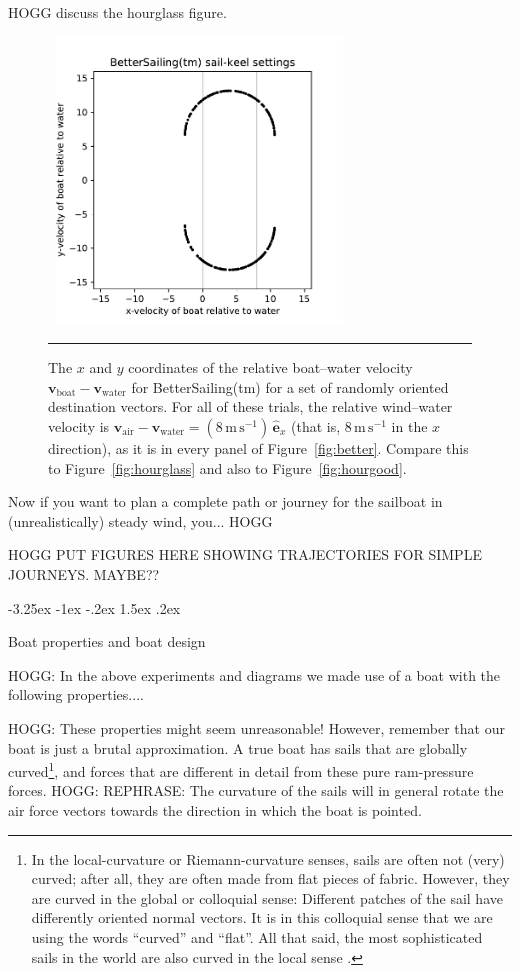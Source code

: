 \documentclass[letterpaper]{article}
\makeatletter
\renewcommand{\vec}[1]{\boldsymbol{#1}}
\newcommand{\uvec}{\vec{\hat{e}}}
\newcommand{\air}{\text{air}}
\newcommand{\water}{\text{water}}
\newcommand{\boat}{\text{boat}}
\newcommand{\vair}{\vec{v}_\air}
\newcommand{\vwater}{\vec{v}_\water}
\newcommand{\vboat}{\vec{v}_\boat}
\newcommand{\mps}{\mathrm{m\,s^{-1}}}
\newcommand{\figref}[1]{Figure~\ref{#1}}
\renewcommand\section{\@startsection {section}{1}{\z@}%
  {-3.25ex \@plus -1ex \@minus -.2ex}%
  {1.5ex \@plus .2ex}%
  {\raggedright\normalfont\large\bfseries}}
\newcommand{\figurerule}{\rule[1ex]{\textwidth}{0.2pt}}
\makeatother
\begin{document}
HOGG discuss the hourglass figure.
\begin{figure}[t!]
  ~\hfill\includegraphics[width=3in]{hourglass-better.pdf}\hfill~
  \caption{The $x$ and $y$ coordinates of the relative boat--water velocity $\vboat-\vwater$ for BetterSailing(tm) for a set of randomly oriented destination vectors.
  For all of these trials, the relative wind--water velocity is $\vair-\vwater=(8\,\mps)\,\uvec_x$ (that is, $8\,\mps$ in the $x$ direction), as it is in every panel of \figref{fig:better}.
  Compare this to \figref{fig:hourglass} and also to \figref{fig:hourgood}.\label{fig:hourbetter}}
  \figurerule
\end{figure}

Now if you want to plan a complete path or journey for the sailboat in (unrealistically) steady wind, you... HOGG

HOGG PUT FIGURES HERE SHOWING TRAJECTORIES FOR SIMPLE JOURNEYS. MAYBE??

\section{Boat properties and boat design}\label{sec:design}

HOGG: In the above experiments and diagrams we made use of a boat with the following properties....

HOGG: These properties might seem unreasonable! However, remember that our boat is just a brutal approximation.
A true boat has sails that are globally curved\footnote{%
In the local-curvature or Riemann-curvature senses, sails are often not (very) curved; after all, they are often made from flat pieces of fabric.
However, they are curved in the global or colloquial sense: Different patches of the sail have differently oriented normal vectors.
It is in this colloquial sense that we are using the words ``curved'' and ``flat''.
All that said, the most sophisticated sails in the world are also curved in the local sense \cite{sails}.},
and forces that are different in detail from these pure ram-pressure forces.
HOGG: REPHRASE: The curvature of the sails will in general rotate the air force vectors towards the direction in which the boat is pointed.
\end{document}
